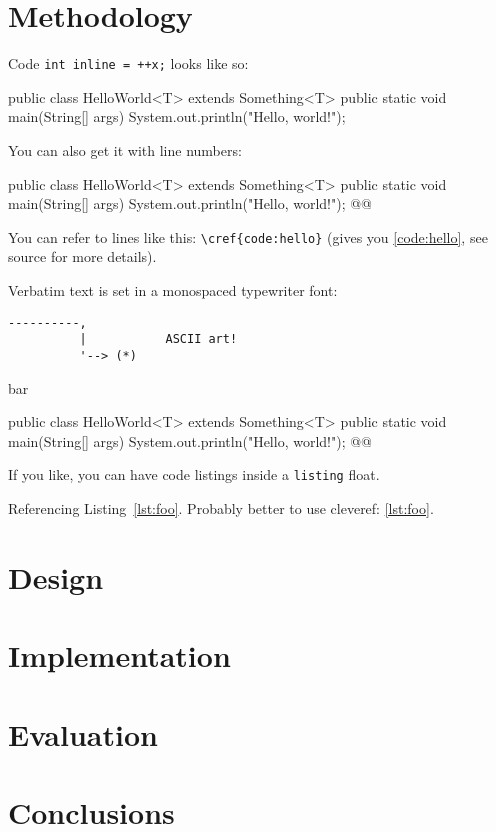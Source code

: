 \documentclass[11pt,titlepage,openright]{book}
\makeatletter
\renewenvironment{listing*}[1][]{%
  \begin{listing}[#1]%
    \checkoddpage%
    \ifoddpage%
      \begin{adjustwidth}{0cm}{-45mm}%
    \else%
      \begin{adjustwidth}{-45mm}{0cm}%
    \fi%
    }{%
    \end{adjustwidth}%
  \end{listing}}
\renewcommand{\c}[1]{\lstinline[style=std]@#1@}
\makeatother
\begin{document}
\chapter{Methodology}
\lipsum[1] Code \c{int inline = ++x;} looks like so:

\begin{Code}
public class HelloWorld<T> extends Something<T> {
  public static void main(String[] args) {
    System.out.println("Hello, world!");
  }
}
\end{Code}

You can also get it with line numbers:

\begin{Code_Numbered}
public class HelloWorld<T> extends Something<T> {
  public static void main(String[] args) {
    System.out.println("Hello, world!"); @\label{code:hello}@
  }
}
\end{Code_Numbered}


You can refer to lines like this: \verb+\cref{code:hello}+ (gives you \cref{code:hello}, see source for more details).

Verbatim text is set in a monospaced typewriter font:

\begin{verbatim}
----------,
          |           ASCII art!
          '--> (*)
\end{verbatim}

\lipsum[2-4]

\begin{table}[!h]
  \caption{bar}
  \label{tab:bar}
\end{table}

\begin{listing*}[t]
\begin{Code_Numbered}
public class HelloWorld<T> extends Something<T> {
  public static void main(String[] args) {
    System.out.println("Hello, world!"); @\label{code:hello:2}@
  }
}
\end{Code_Numbered}
\caption{If you like, you can have code listings inside a \c{listing} float.}
\label{lst:foo}
\end{listing*}

Referencing Listing~\ref{lst:foo}.
Probably better to use cleveref: \cref{lst:foo}.

\chapter{Design}
\lipsum

\chapter{Implementation}
\lipsum

\chapter{Evaluation}
\lipsum

\chapter{Conclusions}
\lipsum



\end{document}
